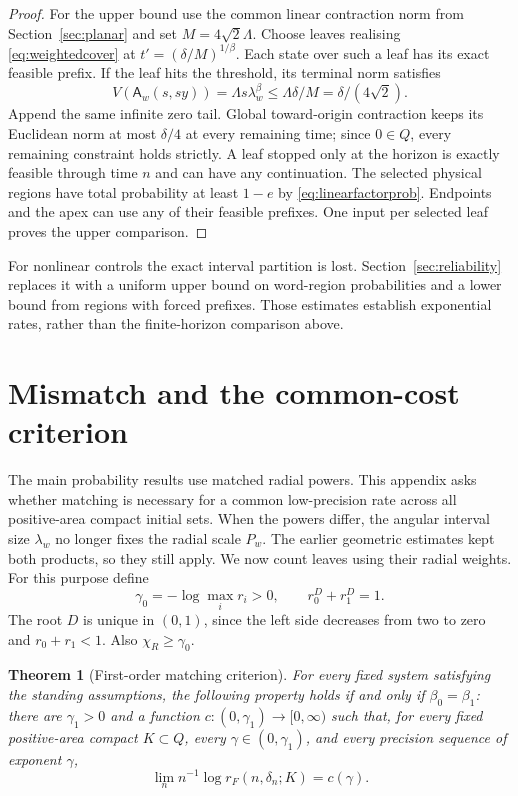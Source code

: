 \documentclass[11pt]{amsart}
\newtheorem{theorem}{Theorem}[section]
\theoremstyle{definition}
\theoremstyle{remark}
\numberwithin{equation}{section}
\begin{document}
\begin{proof}
For the upper bound use the common linear contraction norm from
Section~\ref{sec:planar} and set $M=4\sqrt2\Lambda$.
Choose leaves realising \eqref{eq:weightedcover} at
$t'=(\delta/M)^{1/\beta}$. Each state over such a leaf
has its exact feasible prefix. If the leaf hits the threshold,
its terminal norm satisfies
\[
V(\mathsf A_w(s,sy))=\Lambda s\lambda_w^\beta
                    \le\Lambda\delta/M=\delta/(4\sqrt2).
\]
Append the same infinite zero tail. Global toward-origin contraction
keeps its Euclidean norm at most $\delta/4$ at every remaining
time; since $0\in Q$, every remaining constraint holds strictly.
A leaf stopped only at the horizon is exactly feasible through
time $n$ and can have any continuation. The selected physical
regions have total probability at least $1-e$ by
\eqref{eq:linearfactorprob}. Endpoints and the apex can use any
of their feasible prefixes. One input per selected leaf proves
the upper comparison.
\end{proof}

For nonlinear controls the exact interval partition is lost.
Section~\ref{sec:reliability} replaces it with a uniform upper
bound on word-region probabilities and a lower bound from regions
with forced prefixes. Those estimates establish exponential rates,
rather than the finite-horizon comparison above.


\section{Mismatch and the common-cost criterion}\label{sec:mismatch}

The main probability results use matched radial powers. This appendix asks
whether matching is necessary for a common low-precision rate
across all positive-area compact initial sets. When the powers differ, the angular interval size $\lambda_w$
no longer fixes the radial scale $P_w$. The earlier geometric
estimates kept both products, so they still apply. We now count
leaves using their radial weights.
For this purpose define
\[
\gamma_0=-\log\max_i r_i>0,\qquad r_0^D+r_1^D=1.
\]
The root $D$ is unique in $(0,1)$, since the left side decreases
from two to zero and $r_0+r_1<1$. Also $\chi_R\ge\gamma_0$.

\begin{theorem}[First-order matching criterion]\label{thm:criterion}
For every fixed system satisfying the standing assumptions, the
following property holds if and only if $\beta_0=\beta_1$:
there are $\gamma_1>0$ and a function $c:(0,\gamma_1)\to[0,\infty)$
such that, for every fixed positive-area compact $K\subset Q$,
every $\gamma\in(0,\gamma_1)$, and every precision sequence of
exponent $\gamma$,
\[
\lim_n n^{-1}\log r_F(n,\delta_n;K)=c(\gamma).
\]
\end{theorem}
\end{document}
